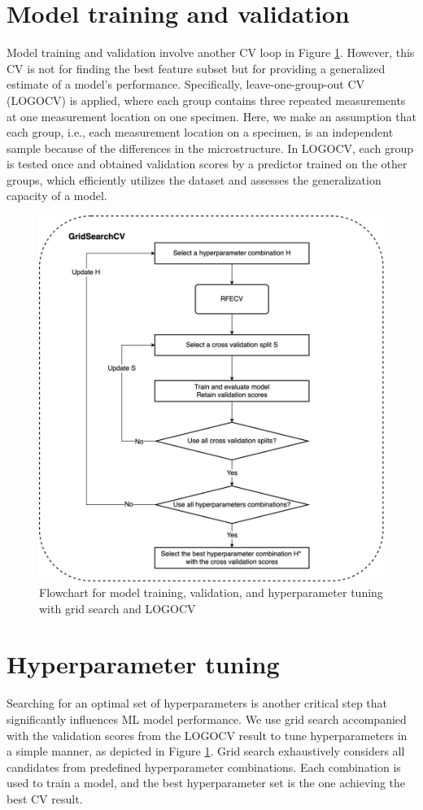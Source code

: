 \section{Model training and validation}
\label{sec: model train and val}
Model training and validation involve another CV loop in Figure \ref{fig: logocv}. However, this CV is not for finding the best feature subset but for providing a generalized estimate of a model's performance. Specifically, leave-one-group-out CV (LOGOCV) \cite{LOGOCV-Saeb059774} is applied, where each group contains three repeated measurements at one measurement location on one specimen. Here, we make an assumption that each group, i.e., each measurement location on a specimen, is an independent sample because of the differences in the microstructure. In LOGOCV, each group is tested once and obtained validation scores by a predictor trained on the other groups, which efficiently utilizes the dataset and assesses the generalization capacity of a model.

\begin{figure}[tb]
    \centering
    \includegraphics[width=0.9\linewidth]{fig/logocv.png}
    \caption{Flowchart for model training, validation, and hyperparameter tuning with grid search and LOGOCV}
    \label{fig: logocv}
\end{figure}

\section{Hyperparameter tuning}
Searching for an optimal set of hyperparameters is another critical step that significantly influences ML model performance. We use grid search \cite{hyperparameter-Feurer2019} accompanied with the validation scores from the LOGOCV result to tune hyperparameters in a simple manner, as depicted in Figure \ref{fig: logocv}. Grid search exhaustively considers all candidates from predefined hyperparameter combinations. Each combination is used to train a model, and the best hyperparameter set is the one achieving the best CV result. 

